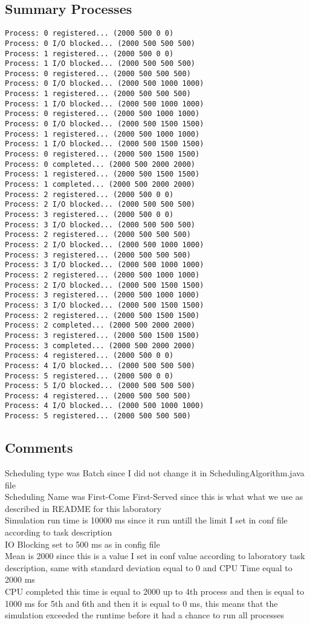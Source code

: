 \documentclass{report}
\begin{document}
\subsection{Summary Processes}
\begin{lstlisting}         
Process: 0 registered... (2000 500 0 0)
Process: 0 I/O blocked... (2000 500 500 500)
Process: 1 registered... (2000 500 0 0)
Process: 1 I/O blocked... (2000 500 500 500)
Process: 0 registered... (2000 500 500 500)
Process: 0 I/O blocked... (2000 500 1000 1000)
Process: 1 registered... (2000 500 500 500)
Process: 1 I/O blocked... (2000 500 1000 1000)
Process: 0 registered... (2000 500 1000 1000)
Process: 0 I/O blocked... (2000 500 1500 1500)
Process: 1 registered... (2000 500 1000 1000)
Process: 1 I/O blocked... (2000 500 1500 1500)
Process: 0 registered... (2000 500 1500 1500)
Process: 0 completed... (2000 500 2000 2000)
Process: 1 registered... (2000 500 1500 1500)
Process: 1 completed... (2000 500 2000 2000)
Process: 2 registered... (2000 500 0 0)
Process: 2 I/O blocked... (2000 500 500 500)
Process: 3 registered... (2000 500 0 0)
Process: 3 I/O blocked... (2000 500 500 500)
Process: 2 registered... (2000 500 500 500)
Process: 2 I/O blocked... (2000 500 1000 1000)
Process: 3 registered... (2000 500 500 500)
Process: 3 I/O blocked... (2000 500 1000 1000)
Process: 2 registered... (2000 500 1000 1000)
Process: 2 I/O blocked... (2000 500 1500 1500)
Process: 3 registered... (2000 500 1000 1000)
Process: 3 I/O blocked... (2000 500 1500 1500)
Process: 2 registered... (2000 500 1500 1500)
Process: 2 completed... (2000 500 2000 2000)
Process: 3 registered... (2000 500 1500 1500)
Process: 3 completed... (2000 500 2000 2000)
Process: 4 registered... (2000 500 0 0)
Process: 4 I/O blocked... (2000 500 500 500)
Process: 5 registered... (2000 500 0 0)
Process: 5 I/O blocked... (2000 500 500 500)
Process: 4 registered... (2000 500 500 500)
Process: 4 I/O blocked... (2000 500 1000 1000)
Process: 5 registered... (2000 500 500 500)
\end{lstlisting}     
\subsection{Comments}
Scheduling type was Batch since I did not change it in SchedulingAlgorithm.java
file \\
Scheduling Name was First-Come First-Served since this is what what we use as
described in README for this laboratory \\
Simulation run time is 10000 ms since it run untill the limit I set in conf file
according to task description \\
IO Blocking set to 500 ms as in config file \\
Mean is 2000 since this is a value I set in conf value according to laboratory
task description, same with standard deviation equal to 0 and CPU Time equal to
2000 ms \\
CPU completed this time is equal to 2000 up to 4th process and then is equal to
1000 ms for 5th and 6th and then it is equal to 0 ms, this means that the
simulation exceeded the runtime before it had a chance to run all processes
\end{document}
